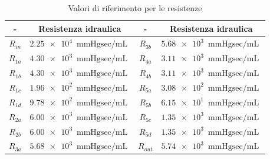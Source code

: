 \documentclass{article}
\begin{document}
\begin{table}[h!]
\begin{center}
\begin{tabular}{| c | c || c | c |}
\hline
- & \textbf{Resistenza idraulica} & - & \textbf{Resistenza idraulica}\\
\hline
$R_{in}$ & $\SI{2.25e4}{\mmHg \sec \per \milli \liter}$ & $R_{3b}$ & $ \SI{5.68e3}{\mmHg \sec \per \milli \liter}$ \\
$R_{1a}$ & $\SI{4.30e3}{\mmHg \sec \per \milli \liter}$ & $R_{4a}$ & $ \SI{3.11e3}{\mmHg \sec \per \milli \liter}$ \\
$R_{1b}$ & $ \SI{4.30e3}{\mmHg \sec \per \milli \liter}$ & $R_{4b}$ & $ \SI{3.11e3}{\mmHg \sec \per \milli \liter}$ \\
$R_{1c}$ & $ \SI{1.96e2}{\mmHg \sec \per \milli \liter}$ & $R_{5a}$ & $ \SI{3.08e2}{\mmHg \sec \per \milli \liter}$ \\
$R_{1d}$ & $ \SI{9.78e2}{\mmHg \sec \per \milli \liter}$ & $R_{5b}$ & $ \SI{6.15e1}{\mmHg \sec \per \milli \liter}$ \\
$R_{2a}$ & $ \SI{6.00e3}{\mmHg \sec \per \milli \liter}$ & $R_{5c}$ & $ \SI{1.35e3}{\mmHg \sec \per \milli \liter}$ \\
$R_{2b}$ & $ \SI{6.00e3}{\mmHg \sec \per \milli \liter}$ & $R_{5d}$ & $ \SI{1.35e3}{\mmHg \sec \per \milli \liter}$ \\
$R_{3a}$ & $ \SI{5.68e3}{\mmHg \sec \per \milli \liter}$ & $R_{out}$ & $ \SI{5.74e3}{\mmHg \sec \per \milli \liter}$ \\
\hline
\end{tabular}
\caption{Valori di riferimento per le resistenze}
\label{tab_resistori}
\end{center}
\end{table}
\end{document}
